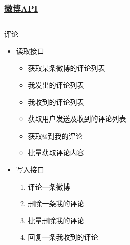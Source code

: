 \documentclass[../Postbot.tex]{subfiles}
\begin{document}
	\begin{frame}
		\frametitle{\href{https://open.weibo.com/wiki/\%E5\%BE\%AE\%E5\%8D\%9AAPI}{微博API}}
		\begin{columns}
			\begin{column}{.9\textwidth}
				评论 \\ 
				\begin{itemize}
					\item {
						读取接口 \\
						\begin{itemize}
							\item 获取某条微博的评论列表
							\item 我发出的评论列表
							\item 我收到的评论列表
							\item 获取用户发送及收到的评论列表
							\item 获取@到我的评论
							\item 批量获取评论内容
						\end{itemize}
						}
					\item {
						写入接口 \\
						\begin{enumerate}
							\item 评论一条微博
							\item 删除一条我的评论
							\item 批量删除我的评论
							\item 回复一条我收到的评论
						\end{enumerate}
						}
				\end{itemize}
			\end{column}		
		\end{columns}
	\end{frame}
\end{document}
